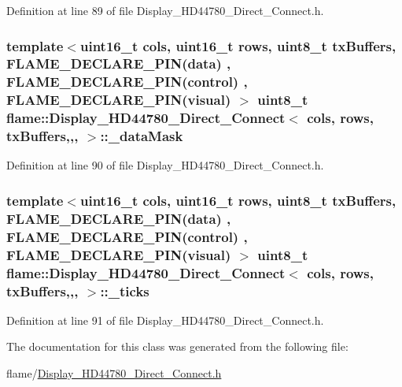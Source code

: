 Definition at line 89 of file Display\-\_\-\-H\-D44780\-\_\-\-Direct\-\_\-\-Connect.\-h.

\hypertarget{classflame_1_1_display___h_d44780___direct___connect_a81a099e0fea9395ebf8559e10280015f}{
\subsubsection[{\-\_\-data\-Mask}]{\setlength{\rightskip}{0pt plus 5cm}template$<$uint16\-\_\-t cols, uint16\-\_\-t rows, uint8\-\_\-t tx\-Buffers, F\-L\-A\-M\-E\-\_\-\-D\-E\-C\-L\-A\-R\-E\-\_\-\-P\-I\-N(data) , F\-L\-A\-M\-E\-\_\-\-D\-E\-C\-L\-A\-R\-E\-\_\-\-P\-I\-N(control) , F\-L\-A\-M\-E\-\_\-\-D\-E\-C\-L\-A\-R\-E\-\_\-\-P\-I\-N(visual) $>$ uint8\-\_\-t {\bf flame\-::\-Display\-\_\-\-H\-D44780\-\_\-\-Direct\-\_\-\-Connect}$<$ cols, rows, tx\-Buffers,,, $>$\-::\-\_\-data\-Mask\hspace{0.3cm}{\ttfamily [protected]}}}\label{classflame_1_1_display___h_d44780___direct___connect_a81a099e0fea9395ebf8559e10280015f}


Definition at line 90 of file Display\-\_\-\-H\-D44780\-\_\-\-Direct\-\_\-\-Connect.\-h.

\hypertarget{classflame_1_1_display___h_d44780___direct___connect_a25ab255622804e4bf62ee318bc4d932e}{
\subsubsection[{\-\_\-ticks}]{\setlength{\rightskip}{0pt plus 5cm}template$<$uint16\-\_\-t cols, uint16\-\_\-t rows, uint8\-\_\-t tx\-Buffers, F\-L\-A\-M\-E\-\_\-\-D\-E\-C\-L\-A\-R\-E\-\_\-\-P\-I\-N(data) , F\-L\-A\-M\-E\-\_\-\-D\-E\-C\-L\-A\-R\-E\-\_\-\-P\-I\-N(control) , F\-L\-A\-M\-E\-\_\-\-D\-E\-C\-L\-A\-R\-E\-\_\-\-P\-I\-N(visual) $>$ uint8\-\_\-t {\bf flame\-::\-Display\-\_\-\-H\-D44780\-\_\-\-Direct\-\_\-\-Connect}$<$ cols, rows, tx\-Buffers,,, $>$\-::\-\_\-ticks\hspace{0.3cm}{\ttfamily [protected]}}}\label{classflame_1_1_display___h_d44780___direct___connect_a25ab255622804e4bf62ee318bc4d932e}


Definition at line 91 of file Display\-\_\-\-H\-D44780\-\_\-\-Direct\-\_\-\-Connect.\-h.



The documentation for this class was generated from the following file\-:\begin{DoxyCompactItemize}
\item 
flame/\hyperlink{_display___h_d44780___direct___connect_8h}{Display\-\_\-\-H\-D44780\-\_\-\-Direct\-\_\-\-Connect.\-h}\end{DoxyCompactItemize}
